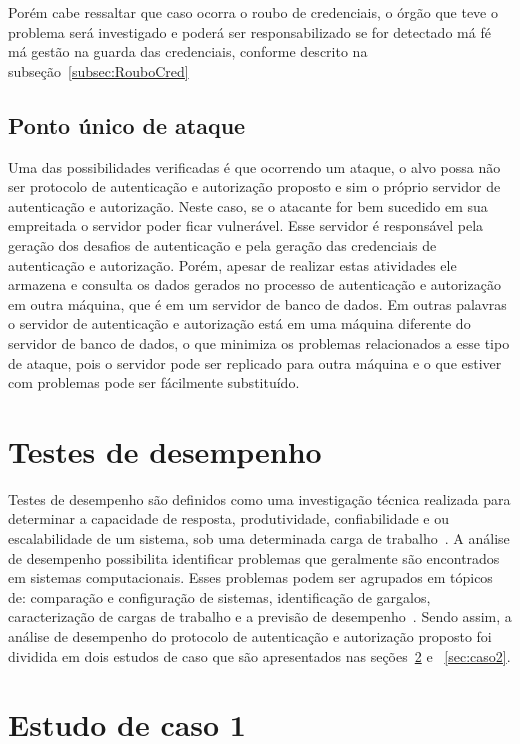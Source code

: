 Porém cabe ressaltar que caso ocorra o roubo de credenciais, o órgão que teve o problema será investigado e poderá ser responsabilizado se for detectado má fé má gestão na guarda das credenciais, conforme descrito na subseção~\ref{subsec:RouboCred}


\subsection{Ponto único de ataque}

Uma das possibilidades verificadas é que ocorrendo um ataque, o alvo possa não ser protocolo de autenticação e autorização proposto e sim o próprio servidor de autenticação e autorização. Neste caso, se o atacante for bem sucedido em sua empreitada o servidor poder ficar vulnerável. Esse servidor é responsável pela geração dos desafios de autenticação e pela geração das credenciais de autenticação e autorização. Porém, apesar de realizar estas atividades ele armazena e consulta os dados gerados no processo de autenticação e autorização em outra máquina, que é em um servidor de banco de dados. Em outras palavras o servidor de autenticação e autorização está em uma máquina diferente do servidor de banco de dados, o que minimiza os problemas relacionados a esse tipo de ataque, pois o servidor pode ser replicado para outra máquina e o que estiver com problemas pode ser fácilmente substituído.

\section{Testes de desempenho}

Testes de desempenho são definidos como uma investigação técnica realizada para determinar a capacidade de resposta, produtividade, confiabilidade e ou escalabilidade de um sistema, sob uma determinada carga de trabalho~\cite{Meier2007}.
A análise de desempenho possibilita identificar problemas que geralmente são encontrados em sistemas computacionais. Esses problemas podem ser agrupados em tópicos de: comparação e configuração de sistemas, identificação de gargalos, caracterização de cargas de trabalho e a previsão de desempenho~\cite{jain1991art}. Sendo assim, a análise de desempenho do protocolo de autenticação e autorização proposto foi dividida em dois estudos de caso que são apresentados nas seções~\ref{sec:caso1} e ~\ref{sec:caso2}.

\section{Estudo de caso 1}\label{sec:caso1}

